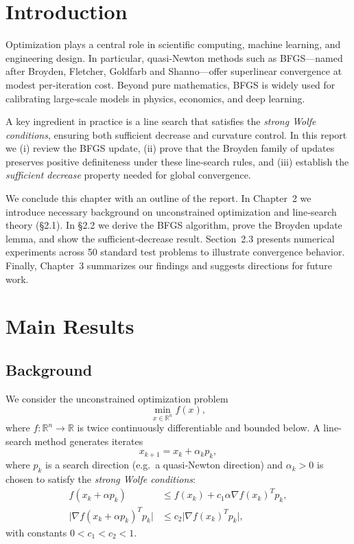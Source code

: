 \documentclass[12pt]{report}
\begin{document}
\chapter{Introduction}
Optimization plays a central role in scientific computing, machine learning, and engineering design.  In particular, quasi‐Newton methods such as BFGS—named after Broyden, Fletcher, Goldfarb and Shanno—offer superlinear convergence at modest per‐iteration cost.  Beyond pure mathematics, BFGS is widely used for calibrating large‐scale models in physics, economics, and deep learning.

A key ingredient in practice is a line search that satisfies the \emph{strong Wolfe conditions}, ensuring both sufficient decrease and curvature control.  In this report we (i) review the BFGS update, (ii) prove that the Broyden family of updates preserves positive definiteness under these line‐search rules, and (iii) establish the \emph{sufficient decrease} property needed for global convergence.

We conclude this chapter with an outline of the report.  In Chapter 2 we introduce necessary background on unconstrained optimization and line‐search theory (\S2.1).  In \S2.2 we derive the BFGS algorithm, prove the Broyden update lemma, and show the sufficient‐decrease result.  Section 2.3 presents numerical experiments across 50 standard test problems to illustrate convergence behavior.  Finally, Chapter 3 summarizes our findings and suggests directions for future work.

\chapter{Main Results}

\section{Background}
We consider the unconstrained optimization problem
\[
	\min_{x\in\mathbb{R}^n} f(x),
\]
where $f:\mathbb{R}^n\to\mathbb{R}$ is twice continuously differentiable and bounded below.
A line‐search method generates iterates
\[
	x_{k+1} = x_k + \alpha_k p_k,
\]
where $p_k$ is a search direction (e.g.\ a quasi‐Newton direction) and $\alpha_k>0$ is chosen to satisfy the \emph{strong Wolfe conditions}:
\begin{align}
	f(x_k + \alpha p_k)                          & \le f(x_k) + c_1 \alpha \nabla f(x_k)^T p_k, \label{eq:sufficient‐decrease} \\
	\bigl|\nabla f(x_k + \alpha p_k)^T p_k\bigr| & \le c_2 \bigl|\nabla f(x_k)^T p_k\bigr|,
\end{align}
with constants $0 < c_1 < c_2 < 1$.
\end{document}
